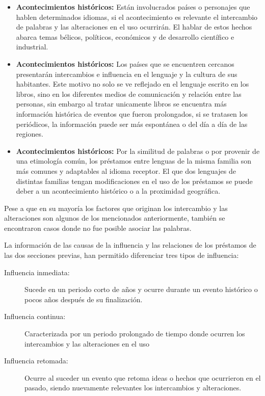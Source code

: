 \begin{itemize}
	\item \textbf{Acontecimientos históricos:} Están involucrados países o personajes que hablen determinados idiomas, si el acontecimiento es relevante el intercambio de palabras y las alteraciones en el uso ocurrirán. El hablar de estos hechos abarca temas bélicos, políticos, económicos y de desarrollo científico e industrial. 
	
	\item \textbf{Acontecimientos históricos:} Los países que se encuentren cercanos presentarán intercambios e influencia en el lenguaje y la cultura de sus habitantes.  Este motivo no solo se ve reflejado en el lenguaje escrito en los libros, sino en los diferentes medios de comunicación y relación entre las personas,  sin embargo al tratar unicamente libros se encuentra más información histórica de eventos que fueron prolongados, si se tratasen los periódicos, la información puede ser más espontánea o del día a día de las regiones. 
	
	\item \textbf{Acontecimientos históricos:} Por la similitud de palabras o por provenir de una etimología común, los préstamos entre lenguas de la misma familia son más comunes y adaptables al idioma receptor. El que dos lenguajes de distintas familias tengan modificaciones en el uso de los préstamos se puede deber a un acontecimiento histórico o a la proximidad geográfica. 
	
	
\end{itemize}

Pese a que en su mayoría los factores que originan los intercambio y las alteraciones son algunos de los mencionados anteriormente, también se encontraron casos donde no fue posible asociar las palabras. 

La información  de las causas de la influencia y las relaciones de los préstamos de las dos secciones previas,  han permitido diferenciar tres tipos de influencia: 

\begin{description}
	
	\item[Influencia inmediata:] Sucede en un periodo corto de años y ocurre durante un evento histórico o pocos años después de su finalización.  
	
	\item[Influencia continua:] Caracterizada por un periodo prolongado de tiempo donde ocurren los intercambios y las alteraciones en el uso
	
	\item[Influencia retomada:] Ocurre al suceder un evento que retoma ideas o hechos que ocurrieron en el pasado, siendo nuevamente relevantes los intercambios y alteraciones. 
	
\end{description}


